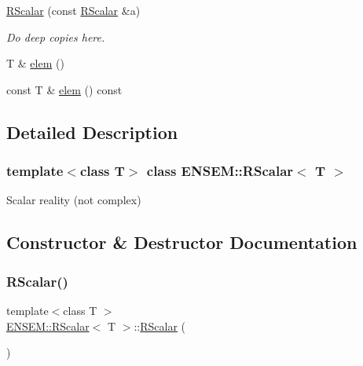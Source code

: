 \begin{DoxyCompactItemize}
\mbox{\hyperlink{classENSEM_1_1RScalar_a6aff5b3d3e105c89b56329e817eca759}{R\+Scalar}} (const \mbox{\hyperlink{classENSEM_1_1RScalar}{R\+Scalar}} \&a)
\begin{DoxyCompactList}\small\item\em Do deep copies here. \end{DoxyCompactList}\item 
T \& \mbox{\hyperlink{classENSEM_1_1RScalar_ac1e3c3dba2379fdcea237f7c2bbb1e0e}{elem}} ()
\item 
const T \& \mbox{\hyperlink{classENSEM_1_1RScalar_a26bfcd896407f15877920b5f737119fe}{elem}} () const
\end{DoxyCompactItemize}


\subsection{Detailed Description}
\subsubsection*{template$<$class T$>$\newline
class E\+N\+S\+E\+M\+::\+R\+Scalar$<$ T $>$}

Scalar reality (not complex) 

\subsection{Constructor \& Destructor Documentation}
\mbox{\label{classENSEM_1_1RScalar_aef2d18c787b469c86b94f18e711cd556}} 
\subsubsection{\texorpdfstring{RScalar()}{RScalar()}\hspace{0.1cm}{\footnotesize\ttfamily [1/15]}}
{\footnotesize\ttfamily template$<$class T $>$ \\
\mbox{\hyperlink{classENSEM_1_1RScalar}{E\+N\+S\+E\+M\+::\+R\+Scalar}}$<$ T $>$\+::\mbox{\hyperlink{classENSEM_1_1RScalar}{R\+Scalar}} (\begin{DoxyParamCaption}{ }\end{DoxyParamCaption})\hspace{0.3cm}{\ttfamily [inline]}}

